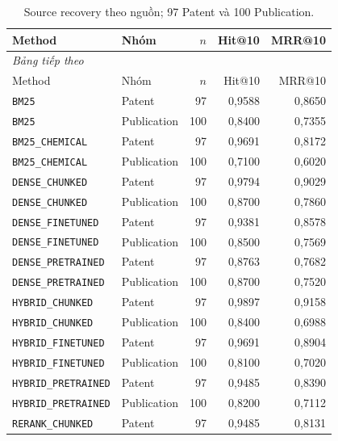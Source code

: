 \begingroup\small\setlength{\tabcolsep}{4pt}\renewcommand{\arraystretch}{1.16}
\begin{longtable}{p{.34\linewidth}lrrr}
\caption{Source recovery theo nguồn; 97 Patent và 100 Publication.}\label{tab:synthetic-source}\\
\toprule Method & Nhóm & $n$ & Hit@10 & MRR@10 \\
\midrule\endfirsthead
\multicolumn{5}{l}{\textit{Bảng tiếp theo}}\\
\toprule Method & Nhóm & $n$ & Hit@10 & MRR@10 \\
\midrule\endhead
\bottomrule\endfoot
{\footnotesize\texttt{BM25}} & Patent & 97 & 0,9588 & 0,8650 \\
{\footnotesize\texttt{BM25}} & Publication & 100 & 0,8400 & 0,7355 \\
{\footnotesize\texttt{BM25\_CHEMICAL}} & Patent & 97 & 0,9691 & 0,8172 \\
{\footnotesize\texttt{BM25\_CHEMICAL}} & Publication & 100 & 0,7100 & 0,6020 \\
{\footnotesize\texttt{DENSE\_CHUNKED}} & Patent & 97 & 0,9794 & 0,9029 \\
{\footnotesize\texttt{DENSE\_CHUNKED}} & Publication & 100 & 0,8700 & 0,7860 \\
{\footnotesize\texttt{DENSE\_FINETUNED}} & Patent & 97 & 0,9381 & 0,8578 \\
{\footnotesize\texttt{DENSE\_FINETUNED}} & Publication & 100 & 0,8500 & 0,7569 \\
{\footnotesize\texttt{DENSE\_PRETRAINED}} & Patent & 97 & 0,8763 & 0,7682 \\
{\footnotesize\texttt{DENSE\_PRETRAINED}} & Publication & 100 & 0,8700 & 0,7520 \\
{\footnotesize\texttt{HYBRID\_CHUNKED}} & Patent & 97 & 0,9897 & 0,9158 \\
{\footnotesize\texttt{HYBRID\_CHUNKED}} & Publication & 100 & 0,8400 & 0,6988 \\
{\footnotesize\texttt{HYBRID\_FINETUNED}} & Patent & 97 & 0,9691 & 0,8904 \\
{\footnotesize\texttt{HYBRID\_FINETUNED}} & Publication & 100 & 0,8100 & 0,7020 \\
{\footnotesize\texttt{HYBRID\_PRETRAINED}} & Patent & 97 & 0,9485 & 0,8390 \\
{\footnotesize\texttt{HYBRID\_PRETRAINED}} & Publication & 100 & 0,8200 & 0,7112 \\
{\footnotesize\texttt{RERANK\_CHUNKED}} & Patent & 97 & 0,9485 & 0,8131 \\

\end{longtable}

